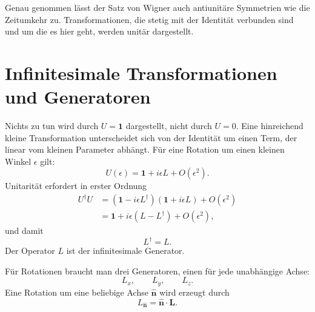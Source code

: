 Genau genommen lässt der Satz von Wigner auch antiunitäre Symmetrien wie die Zeitumkehr zu. Transformationen, die stetig mit der Identität verbunden sind und um die es hier geht, werden unitär dargestellt. 

\section{Infinitesimale Transformationen und Generatoren}

Nichts zu tun wird durch \(U=\mathbf 1\) dargestellt, nicht durch \(U=0\). Eine hinreichend kleine Transformation unterscheidet sich von der Identität um einen Term, der linear vom kleinen Parameter abhängt. Für eine Rotation um einen kleinen Winkel \(\epsilon\) gilt:
\begin{equation}
U(\epsilon)=\mathbf 1+i\epsilon L+O(\epsilon^2).
\end{equation}
Unitarität erfordert in erster Ordnung
\begin{align}
U^\dagger U
&=\left(\mathbf 1-i\epsilon L^\dagger\right)
  \left(\mathbf 1+i\epsilon L\right)+O(\epsilon^2)\\
&=\mathbf 1+i\epsilon(L-L^\dagger)+O(\epsilon^2),
\end{align}
und damit
\begin{equation}
L^\dagger=L.
\end{equation}
Der Operator \(L\) ist der infinitesimale Generator.

Für Rotationen braucht man drei Generatoren, einen für jede unabhängige Achse:
\begin{equation}
L_x,\qquad L_y,\qquad L_z.
\end{equation}
Eine Rotation um eine beliebige Achse \(\widehat{\bm n}\) wird erzeugt durch
\begin{equation}
L_{\widehat{\bm n}}=\widehat{\bm n}\cdot\bm L.
\end{equation}

\begin{classroomqa}
\end{classroomqa}

